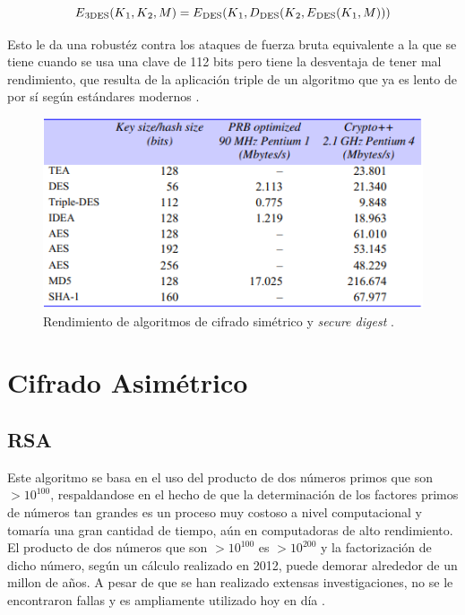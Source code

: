 \[E\textsubscript{3DES}(K\textsubscript{1}, K\textsubscript{2}, M) = 
E\textsubscript{DES}(K\textsubscript{1}, D\textsubscript{DES}
(K\textsubscript{2}, E\textsubscript{DES}(K\textsubscript{1}, M)))\]

Esto le da una robustéz contra los ataques de fuerza bruta equivalente a la que 
se tiene cuando se usa una clave de 112 bits pero tiene la desventaja de tener 
mal rendimiento, que resulta de la aplicación triple de un algoritmo que ya es 
lento de por sí según estándares modernos \cite{coulouris}.

\begin{figure}[H]
    \centering
        \includegraphics{img/rendimientoAlgoritmos.PNG}
    \caption{Rendimiento de algoritmos de cifrado simétrico y 
    \emph{secure digest} \cite{coulouris}.}
    \label{tabla:rendimiento}
\end{figure}



\section{Cifrado Asimétrico}

\subsection{RSA}\label{secc:rsa}

Este algoritmo se basa en el uso del producto de dos números primos que son 
\(> 10^{100}\), respaldandose en el hecho de que la determinación de los factores 
primos de números tan grandes es un proceso muy costoso a nivel computacional y 
tomaría una gran cantidad de tiempo, aún en computadoras de alto rendimiento. 
El producto de dos números que son  \(> 10^{100}\) es  
\(> 10^{200}\) y la factorización de dicho número, según un cálculo realizado 
en 2012, puede demorar alrededor de un millon de años. 
A pesar de que se han realizado extensas investigaciones, no se le encontraron 
fallas y es ampliamente utilizado hoy en día \cite{coulouris}.

